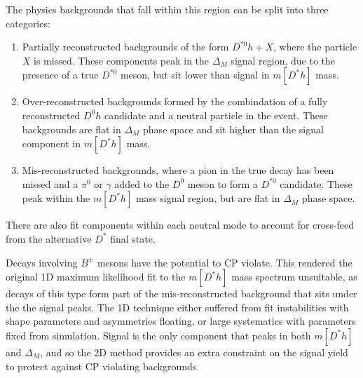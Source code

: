\documentclass[oneside,12pt]{article}
\begin{document}
The physics backgrounds that fall within this region can be split into three
categories:
\begin{enumerate}
  \item Partially reconstructed backgrounds of the form $D^{*0}h+X$, where the
  particle $X$ is missed. These components peak in the $\Delta_M$ signal region,
  due to the presence of a true $D^{*0}$ meson, but sit lower than signal in
  $m[D^*h]$ mass.
  \item Over-reconstructed backgrounds formed by the combindation of a fully
  reconstructed $D^0h$ candidate and a neutral particle in the event. These
  backgrounds are flat in $\Delta_M$ phase space and sit higher than the signal
  component in $m[D^*h]$ mass.
  \item Mis-reconstructed backgrounds, where a pion in the true decay has been missed and
  a $\pi^0$ or $\gamma$ added to the $D^0$ meson to form a $D^{*0}$ candidate.
  These peak within the $m[D^*h]$ mass signal region, but are flat in $\Delta_M$
  phase space.
\end{enumerate}

There are also fit components within each neutral mode to account for
cross-feed from the alternative $D^*$ final state. 

Decays involving $B^{\pm}$ mesons have the potential to CP violate. This
rendered the original 1D maximum likelihood fit to the $m[D^*h]$ mass spectrum
unsuitable, as decays of this type form part of the mis-reconstructed
background that sits under the the signal peaks. The 1D technique either suffered
from fit instabilities with shape parameters and asymmetries floating, or large
systematics with parameters fixed from simulation. Signal is the only component
that peaks in both $m[D^*h]$ and $\Delta_M$, and so the 2D method provides an
extra constraint on the signal yield to protect against CP violating
backgrounds.
\end{document}
